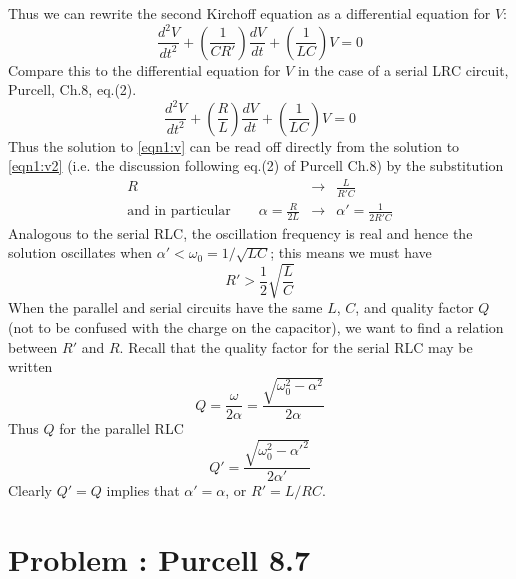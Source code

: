 \documentclass[solutions]{esg8022pset}
\begin{document}
  Thus we can rewrite the second Kirchoff equation as a differential
  equation for $V$:
  \begin{equation}\label{eqn1:v}
  \frac{d^2V}{dt^2}+\left(\frac{1}{CR'}\right)\frac{dV}{dt}+\left(\frac{1}{LC}\right)V=0
  \end{equation}
  Compare this to the differential equation for $V$ in the case of a
  serial LRC circuit, Purcell, Ch.8, eq.(2).
  \begin{equation}\label{eqn1:v2}
  \frac{d^2V}{dt^2}+\left(\frac{R}{L}\right)\frac{dV}{dt}+\left(\frac{1}{LC}\right)V=0
  \end{equation}
  Thus the solution to \autoref{eqn1:v} can be read off directly
  from the solution to \autoref{eqn1:v2} (i.e. the discussion
  following eq.(2) of Purcell Ch.8) by the substitution
  \begin{align}
  R &\rightarrow & \frac{L}{R'C}\\ \text{and in particular}\qquad
  \alpha=\frac{R}{2L} &\rightarrow & \alpha'=\frac{1}{2R'C}
  \end{align}
  Analogous to the serial RLC, the oscillation frequency is real and hence
  the solution oscillates when $\alpha'<\omega_0=1/\sqrt{LC}$; this
  means we must have
  \begin{equation}
  R'>\frac{1}{2}\sqrt{\frac{L}{C}}
  \end{equation}
  When the parallel and serial circuits have the same $L$, $C$, and quality
  factor $Q$ (not to be confused with the charge on the capacitor), we
  want to find a relation between $R'$ and $R$.  Recall that the quality
  factor for the serial RLC may be written
  \begin{equation}
  Q=\frac{\omega}{2\alpha}=\frac{\sqrt{\omega_0^2-\alpha^2}}{2\alpha}
  \end{equation}
  Thus $Q$ for the parallel RLC
  \begin{equation}
  Q'=\frac{\sqrt{\omega_0^2-\alpha'^2}}{2\alpha'}
  \end{equation}
  Clearly $Q'=Q$ implies that $\alpha'=\alpha$, or $R'=L/RC$.

\section{Problem \thesection: Purcell 8.7}
\end{document}
